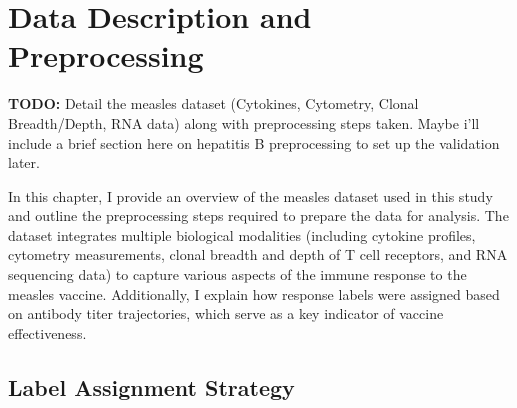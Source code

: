 \documentclass[12pt,a4paper]{report}
\newcommand{\todo}[1]{%
  \par\noindent%
  \begin{tcolorbox}[colback=yellow, colframe=black, boxrule=0.5pt, sharp corners, width=\linewidth, before skip=5pt, after skip=5pt]
    \textbf{TODO:} #1
  \end{tcolorbox}%
  \par
}
\newcommand{\remark}[1]{%
  \par\noindent%
  \begin{tcolorbox}[ colback=orange!20!white, colframe=orange!80!black, boxrule=0.5pt, sharp corners, width=\linewidth, ]
    {\textbf{\textcolor{orange!80!black}!REMARK:}}~#1
  \end{tcolorbox}%
}
\begin{document}
\chapter{Data Description and Preprocessing}
\todo{Detail the measles dataset (Cytokines, Cytometry, Clonal Breadth/Depth, RNA data) along with preprocessing steps taken.
Maybe i'll include a brief section here on hepatitis B preprocessing to set up the validation later.}
\noindent
In this chapter, I provide an overview of the measles dataset used in this study and outline the preprocessing steps required to prepare the data for analysis. The dataset integrates multiple biological modalities (including cytokine profiles, cytometry measurements, clonal breadth and depth of T cell receptors, and RNA sequencing data) to capture various aspects of the immune response to the measles vaccine. Additionally, I explain how response labels were assigned based on antibody titer trajectories, which serve as a key indicator of vaccine effectiveness. 

\section{Label Assignment Strategy}
\end{document}
